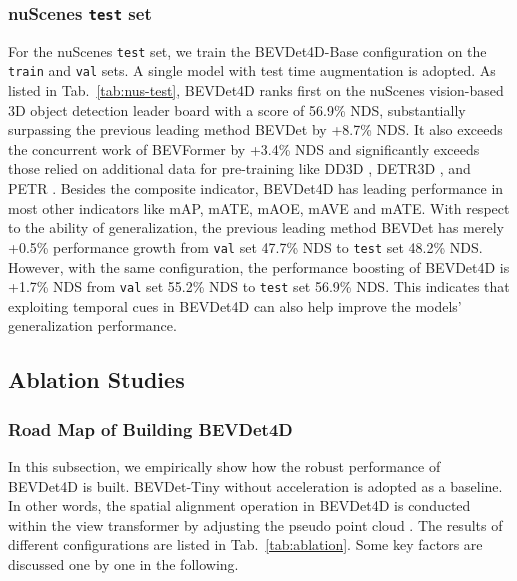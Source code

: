 \documentclass[10pt,twocolumn,letterpaper]{article}
\begin{document}
\subsubsection{nuScenes \texttt{test} set}
For the nuScenes \texttt{test} set, we train the BEVDet4D-Base configuration on the \texttt{train} and \texttt{val} sets. A single model with test time augmentation is adopted. As listed in Tab.~\ref{tab:nus-test}, BEVDet4D ranks first on the nuScenes vision-based 3D object detection leader board with a score of 56.9\% NDS, substantially surpassing the previous leading method BEVDet \cite{BEVDet} by +8.7\% NDS. It also exceeds the concurrent work of BEVFormer \cite{BEVFormer} by +3.4\% NDS and significantly exceeds those relied on additional data for pre-training like DD3D \cite{DD3D}, DETR3D \cite{DETR3D}, and PETR \cite{PETR}. Besides the composite indicator, BEVDet4D has leading performance in most other indicators like mAP, mATE, mAOE, mAVE and mATE. With respect to the ability of generalization, the previous leading method BEVDet \cite{BEVDet} has merely +0.5\% performance growth from \texttt{val} set 47.7\% NDS to \texttt{test} set 48.2\% NDS. However, with the same configuration, the performance boosting of BEVDet4D is +1.7\% NDS from \texttt{val} set 55.2\% NDS to \texttt{test} set 56.9\% NDS. This indicates that exploiting temporal cues in BEVDet4D can also help improve the models' generalization performance.






\subsection{Ablation Studies}

\subsubsection{Road Map of Building BEVDet4D}
In this subsection, we empirically show how the robust performance of BEVDet4D is built. BEVDet-Tiny \cite{BEVDet} without acceleration is adopted as a baseline. In other words, the spatial alignment operation in BEVDet4D is conducted within the view transformer by adjusting the pseudo point cloud \cite{LSS}. The results of different configurations are listed in Tab.~\ref{tab:ablation}. Some key factors are discussed one by one in the following.
\end{document}
